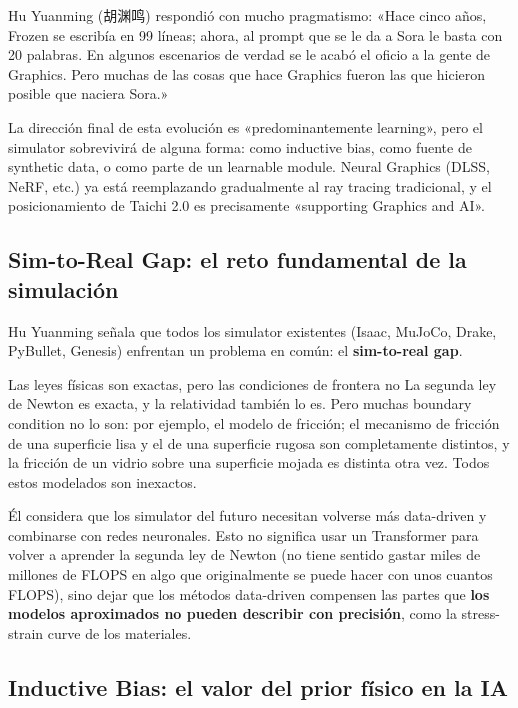 Hu Yuanming (胡渊鸣) respondió con mucho pragmatismo: «Hace cinco años, Frozen se escribía en 99 líneas; ahora, al prompt que se le da a Sora le basta con 20 palabras. En algunos escenarios de verdad se le acabó el oficio a la gente de Graphics. Pero muchas de las cosas que hace Graphics fueron las que hicieron posible que naciera Sora.»

La dirección final de esta evolución es «predominantemente learning», pero el simulator sobrevivirá de alguna forma: como inductive bias, como fuente de synthetic data, o como parte de un learnable module. Neural Graphics (DLSS, NeRF, etc.) ya está reemplazando gradualmente al ray tracing tradicional, y el posicionamiento de Taichi 2.0 es precisamente «supporting Graphics and AI».

\subsection{Sim-to-Real Gap: el reto fundamental de la simulación}

Hu Yuanming señala que todos los simulator existentes (Isaac, MuJoCo, Drake, PyBullet, Genesis) enfrentan un problema en común: el \textbf{sim-to-real gap}.

\begin{warningbox}{Las leyes físicas son exactas, pero las condiciones de frontera no}
La segunda ley de Newton es exacta, y la relatividad también lo es. Pero muchas boundary condition no lo son: por ejemplo, el modelo de fricción; el mecanismo de fricción de una superficie lisa y el de una superficie rugosa son completamente distintos, y la fricción de un vidrio sobre una superficie mojada es distinta otra vez. Todos estos modelados son inexactos.
\end{warningbox}

Él considera que los simulator del futuro necesitan volverse más data-driven y combinarse con redes neuronales. Esto no significa usar un Transformer para volver a aprender la segunda ley de Newton (no tiene sentido gastar miles de millones de FLOPS en algo que originalmente se puede hacer con unos cuantos FLOPS), sino dejar que los métodos data-driven compensen las partes que \textbf{los modelos aproximados no pueden describir con precisión}, como la stress-strain curve de los materiales.

\subsection{Inductive Bias: el valor del prior físico en la IA}

